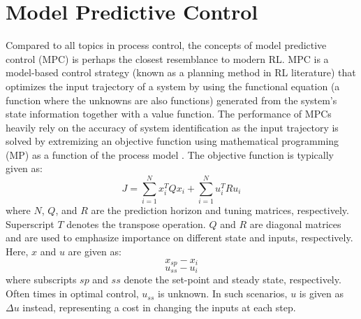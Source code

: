 %
%
%
%

\section{Model Predictive Control}

Compared to all topics in process control, the concepts of model predictive control (MPC) is perhaps the closest resemblance to modern RL.  MPC is a model-based control strategy (known as a planning method in RL literature) that optimizes the input trajectory of a system by using the functional equation (a function where the unknowns are also functions) generated from the system's state information together with a value function. The performance of MPCs heavily rely on the accuracy of system identification as the input trajectory is solved by extremizing an objective function using mathematical programming (MP) as a function of the process model \cite{mpc}. The objective function is typically given as:
\begin{equation}
    J = \sum\limits^{N}_{i = 1} x_i^TQx_i + \sum\limits^N_{i=1}u_i^TRu_i
    \label{eq:mpc_cost}
\end{equation}
where $N$, $Q$, and $R$ are the prediction horizon and tuning matrices, respectively. Superscript $T$ denotes the transpose operation. $Q$ and $R$ are diagonal matrices and are used to emphasize importance on different state and inputs, respectively. Here, $x$ and $u$ are given as:
\begin{equation}
    x_{sp} - x_i
\end{equation}
\begin{equation}
    u_{ss} - u_i
\end{equation}
where subscripts $sp$ and $ss$ denote the set-point and steady state, respectively. Often times in optimal control, $u_{ss}$ is unknown. In such scenarios, $u$ is given as $\Delta u$ instead, representing a cost in changing the inputs at each step.

